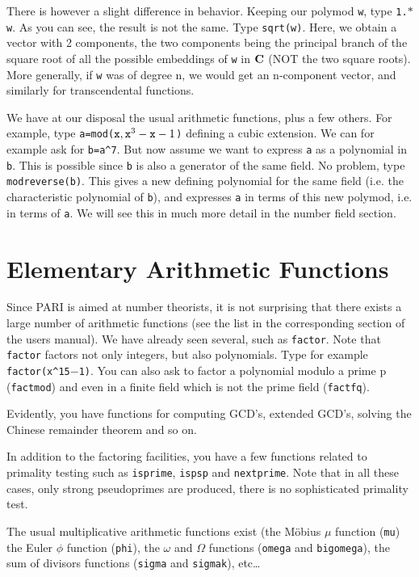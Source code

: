 There is however a slight difference in behavior. Keeping our polymod {\tt w},
type {\tt 1.$*$w}. As you can see, the result is not the same. Type
{\tt sqrt(w)}. Here, we obtain a vector with 2 components, the two components
being the principal branch of the square root of all the possible embeddings
of {\tt w} in $\Bbb C$ (NOT the two square roots). More generally, if {\tt w}
was of degree n, we would get an n-component vector, and similarly for
transcendental functions.

We have at our disposal the usual arithmetic functions, plus a few others.
For example, type {\tt a=mod($\x,\x^3-\x-1$)} defining a cubic extension.
We can for example ask for {\tt b=a\^{}7}. But now assume we want to express
{\tt a} as a polynomial in {\tt b}. This is possible since {\tt b} is also a
generator of the same field. No problem, type {\tt modreverse(b)}. This gives
a new defining polynomial for the same field (i.e. the characteristic 
polynomial of {\tt b}), and expresses {\tt a} in terms of this new polymod, i.e.
in terms of {\tt a}. We will see this in much more detail in the number field
section.
\medskip
\section{Elementary Arithmetic Functions}
\medskip
Since PARI is aimed at number theorists, it is not surprising that there
exists a large number of arithmetic functions (see the list in the 
corresponding section of the users manual). We have already seen several, such
as {\tt factor}. Note that {\tt factor} factors not only integers, but also
polynomials. Type for example {\tt factor(x\^{}15$-$1)}. You can also ask to
factor a polynomial modulo a prime p ({\tt factmod}) and even in a finite
field which is not the prime field ({\tt factfq}).

Evidently, you have functions for computing GCD's, extended GCD's, solving
the Chinese remainder theorem and so on.

In addition to the factoring facilities, you have a few functions related to
primality testing such as {\tt isprime}, {\tt ispsp} and {\tt nextprime}.
Note that in all these cases, only strong pseudoprimes are produced, there
is no sophisticated primality test.

The usual multiplicative arithmetic functions exist (the M\"obius $\mu$ 
function ({\tt mu}) the Euler $\phi$ function ({\tt phi}), the $\omega$
and $\Omega$ functions ({\tt omega} and {\tt bigomega}), the sum of divisors
functions ({\tt sigma} and {\tt sigmak}), etc\dots

